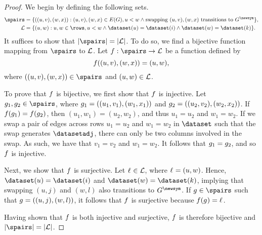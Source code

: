 \begin{proof}
  We begin by defining the following sets.
  \begin{align*}
    \spairs &= \{((u, v), (w, x)) : (u, v), (w, x) \in \edges(\graph), u < w
    \wedge \text{swapping $(u, v), (w, x)$ transitions to $\graphadj$}\}, \\
    \eqswaprows &= \{(u, w) : u, w \in \rows, u < w \wedge \dataset(u) =
    \dataset(i) \wedge \dataset(w) = \dataset(k)\}.
  \end{align*}
  It suffices to show that $|\spairs| = |\eqswaprows|$. To do so, we find a
  bijective function mapping from $\spairs$ to $\mathcal{L}$.  Let $\bijfunc :
  \spairs \rightarrow \eqswaprows$ be a function defined by
  \[
    f((u, v), (w, x)) = (u, w),
  \]
  where $((u, v), (w, x)) \in \spairs$ and $(u, w) \in \mathcal{L}$.

  To prove that $f$ is bijective, we first show that $f$ is
  injective. Let $\spairselem{1}, \spairselem{2} \in \spairs$, where
  $g_{1} = ((u_1, v_1), (w_1, x_1))$ and $g_{2} = ((u_2,
  v_2), (w_2, x_2))$. If $f(g_{1}) = f(g_{2})$,
  then $(u_1, w_1) = (u_2, w_2)$, and thus $u_1 = u_2$ and $w_1 = w_2$. If we
  swap a pair of edges across rows $u_1 = u_2$ and $w_1 = w_2$ in $\dataset$
  such that the swap generates $\datasetadj$, there can only be two columns
  involved in the swap. As such, we have that $v_1 = v_2$ and $w_1 = w_2$. It
  follows that $g_{1} = g_{2}$, and so $f$ is
  injective.

  Next, we show that $f$ is surjective. Let $\ell_{} \in
  \mathcal{L}$, where $\ell_{} = (u, w)$. Hence, $\dataset(u) =
  \dataset(i)$ and $\dataset(w) = \dataset(k)$, implying that swapping $(u, j)$
  and $(w, l)$ also transitions to $\graphadj$. If $\spairselem{} \in \spairs$
  such that $g_{} = ((u, j), (w, l))$, it follows that $f$ is
  surjective because $f(g_{}) = \ell_{}$.

  Having shown that $f$ is both injective and surjective, $f$ is
  therefore bijective and $|\spairs| = |\eqswaprows|$.
\end{proof}

